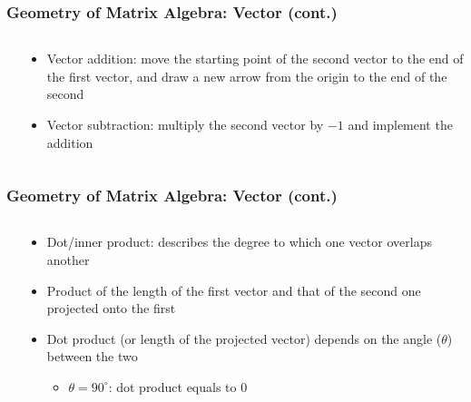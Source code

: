 \documentclass[pdflatex, 12pt]{beamer}
\begin{document}
\begin{frame}
\frametitle{Geometry of Matrix Algebra: Vector (cont.)}
\begin{columns}
\begin{column}{0.5\textwidth}
\centering
{}
\end{column}
\begin{column}{0.5\textwidth}
\begin{itemize}
\item Vector addition: move the starting point of the second vector to the end of the first vector, and draw a new arrow from the origin to the end of the second
\vspace{0.4cm}
\item Vector subtraction: multiply the second vector by $-1$ and implement the addition
\end{itemize}
\end{column}
\end{columns}
\end{frame}

\begin{frame}
\frametitle{Geometry of Matrix Algebra: Vector (cont.)}
\begin{columns}
\begin{column}{0.5\textwidth}
\centering
{}
\end{column}
\begin{column}{0.5\textwidth}
\begin{itemize}
\item Dot/inner product: describes the degree to which one vector overlaps another
\vspace{0.4cm}
\item Product of the length of the first vector and that of the second one projected onto the first
\vspace{0.4cm}
\item Dot product (or length of the projected vector) depends on the angle ($\theta$) between the two
 \begin{itemize}
 \item $\theta = 90^{\circ}$: dot product equals to 0 
 \end{itemize}
\end{itemize}
\end{column}
\end{columns}
\end{frame}
\end{document}
